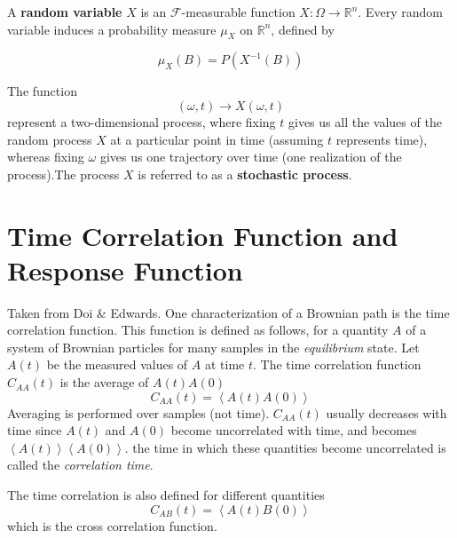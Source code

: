 \documentclass[12pt]{book}
\begin{document}
A \textbf{random variable} $X$ is an $\mathcal{F}$-measurable function $X:\Omega\rightarrow \mathbb{R}^n$. Every random variable induces a probability measure $\mu_X$ on $\mathbb{R}^n$, defined by 

\begin{equation*}
\mu_X(B) = P(X^{-1}(B))
\end{equation*}

The function 
\begin{equation*}
(\omega,t)\rightarrow X(\omega,t)
\end{equation*}
represent a two-dimensional process, where fixing $t$ gives us all the values of the random process $X$ at a particular point in time (assuming $t$ represents time), whereas fixing $\omega$ gives us one trajectory over time (one realization of the process).The process $X$ is referred to as a \textbf{stochastic process}.

\section{Time Correlation Function and Response Function}\label{section:timeCorrelationAndResponseFunction}
Taken from Doi \& Edwards. One characterization of a Brownian path is the time correlation function. This function is defined as follows, for a quantity $A$ of a system of Brownian particles for many samples in the \textit{equilibrium} state. Let $A(t)$ be the measured values of $A$ at time $t$. The time correlation function $C_{AA}(t)$ is the average of $A(t)A(0)$
\begin{equation*}
C_{AA}(t)=\left<A(t)A(0) \right>
\end{equation*}
Averaging is performed over samples (not time). $C_{AA}(t)$ usually decreases with time since $A(t)$ and $A(0)$ become uncorrelated with time, and becomes $\left< A(t)\right> \left< A(0)\right>$. the time in which these quantities become uncorrelated is called the \textit{correlation time}. 

The time correlation is also defined for different quantities 
\begin{equation*}
C_{AB}(t)= \left< A(t)B(0) \right>
\end{equation*}
which is the cross correlation function. 
\end{document}
